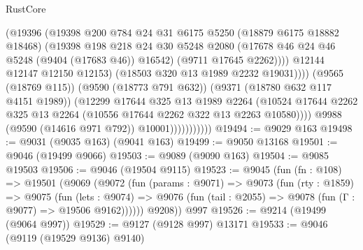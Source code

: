 \begin{lexlean}{RustCore}
\begin{coremodule}
                                    (@19396
                                      (@19398
                                        @200
                                        @784
                                        @24
                                        @31
                                        @6175
                                        @5250
                                        (@18879 @6175 @18882 @18468)
                                        (@19398
                                          @198
                                          @218
                                          @24
                                          @30
                                          @5248
                                          @2080
                                          (@17678 @46 @24 @46 @5248 (@9404 (@17683 @46)) @16542)
                                          (@9711 @17645 @2262))))
                                    @12144
                                    @12147
                                    @12150
                                    @12153)
                                  (@18503 @320 @13 @1989 @2232 @19031))))
                            (@9565 (@18769 @115))
                            (@9590 (@18773 @791 @632))
                            (@9371 (@18780 @632 @117 @4151 @1989))
                            (@12299
                              @17644
                              @325
                              @13
                              @1989
                              @2264
                              (@10524
                                @17644
                                @2262
                                @325
                                @13
                                @2264
                                (@10556 @17644 @2262 @322 @13 @2263 @10580))))
                          @9988
                          (@9590 (@14616 @971 @792))
                          @10001)))))))))))
@19494 := @9029 @163
@19498 := @9031 (@9035 @163) (@9041 @163)
@19499 := @9050 @13168
@19501 := @9046 (@19499 @9066)
@19503 := @9089 (@9090 @163)
@19504 := @9085 @19503
@19506 := @9046 (@19504 @9115)
@19523 := @9045
    (fun (fn : @108) =>
    @19501
      (@9069
        (@9072
          (fun (params : @9071) =>
          @9073
            (fun (rty : @1859) =>
            @9075
              (fun (lets : @9074) =>
              @9076 (fun (tail : @2055) => @9078 (fun (Γ : @9077) => @19506 @9162))))))
        @9208))
    @997
@19526 := @9214 (@19499 (@9064 @997))
@19529 := @9127 (@9128 @997) @13171
@19533 := @9046 (@9119 (@19529 @9136) @9140)

\end{coremodule}
\end{lexlean}

